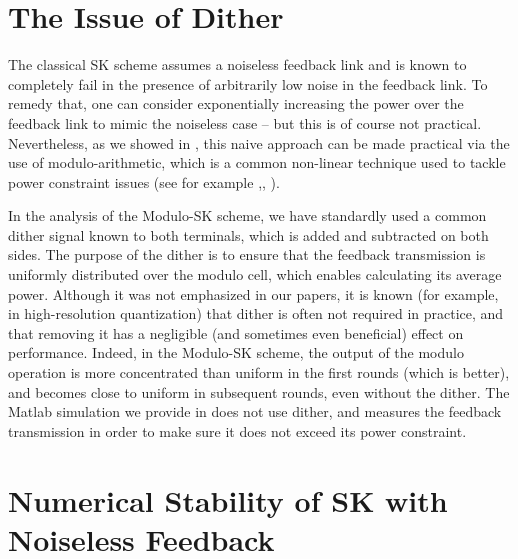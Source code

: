 \section{The Issue of Dither}
The classical SK scheme \cite{S-K_partII} assumes a noiseless feedback link and is known to completely fail in the presence of arbitrarily low noise in the feedback link. To remedy that, one can consider exponentially increasing the power over the feedback link to mimic the noiseless case -- but this is of course not practical. Nevertheless, as we showed in \cite{SimpleInteractionAllerton2014,ben2017interactive}, this naive approach can be made practical via the use of modulo-arithmetic, which is a common non-linear technique used to tackle power constraint issues (see for example \cite{Tomlinson},\cite{KochmanZamirJointWZWDP},
\cite{ErezShamaiZamir}). 

In the analysis of the Modulo-SK scheme, we have standardly used a common dither signal known to both terminals, which is added and subtracted on both sides. The purpose of the dither is to ensure that the feedback transmission is uniformly distributed over the modulo cell, which enables calculating its average power. Although it was not emphasized in our papers, it is known (for example, {in high-resolution quantization}) that dither is often not required in practice, and that removing it has a negligible (and sometimes even beneficial) effect on performance. 
Indeed, in the Modulo-SK scheme, the output of the modulo operation is more concentrated than uniform in the first rounds (which is better), and becomes close to uniform in subsequent rounds, even without the dither. The Matlab simulation we provide in \cite{ModuloSKcode} does not use dither, and measures the feedback transmission in order to make sure it does not exceed its power constraint.

\section{Numerical Stability of SK with Noiseless Feedback}

